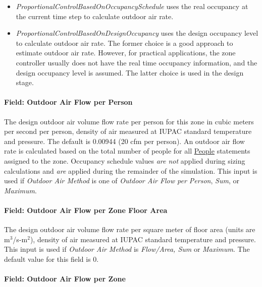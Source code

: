 \begin{itemize}
\item  \emph{ProportionalControlBasedOnOccupancySchedule} uses the real occupancy at the current time step to calculate outdoor air rate.

\item  \emph{ProportionalControlBasedOnDesignOccupancy} uses the design occupancy level to calculate outdoor air rate. The former choice is a good approach to estimate outdoor air rate. However, for practical applications, the zone controller usually does not have the real time occupancy information, and the design occupancy level is assumed. The latter choice is used in the design stage.

\end{itemize}


\paragraph{Field: Outdoor Air Flow per Person}\label{field-outdoor-air-flow-per-person}

The design outdoor air volume flow rate per person for this zone in cubic meters per second per person, density of air measured at IUPAC standard temperature and pressure. The default is 0.00944 (20 cfm per person). An outdoor air flow rate is calculated based on the total number of people for all \hyperref[people]{People} statements assigned to the zone. Occupancy schedule values \emph{are not} applied during sizing calculations and \emph{are} applied during the remainder of the simulation. This input is used if \emph{Outdoor Air Method} is one of \emph{Outdoor Air Flow per Person}, \emph{Sum}, or \emph{Maximum}.

\paragraph{Field: Outdoor Air Flow per Zone Floor Area}\label{field-outdoor-air-flow-per-zone-floor-area}

The design outdoor air volume flow rate per square meter of floor area (units are m\(^{3}\)/s-m\(^{2}\)), density of air measured at IUPAC standard temperature and pressure. This input is used if \emph{Outdoor Air Method} is \emph{Flow/Area, Sum} or \emph{Maximum}. The default value for this field is 0.

\paragraph{Field: Outdoor Air Flow per Zone}\label{field-outdoor-air-flow-per-zone}

